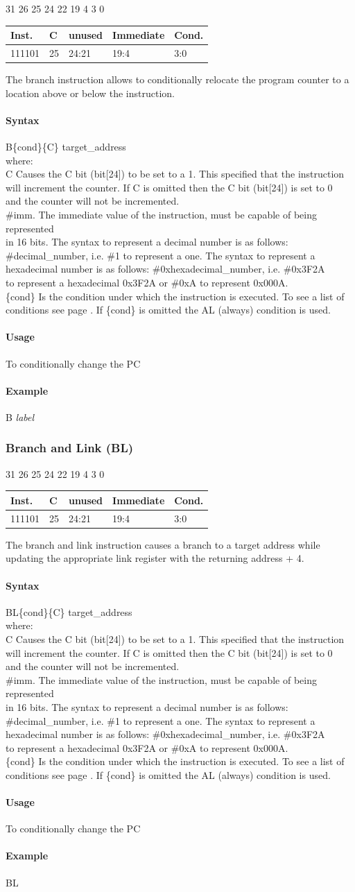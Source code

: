 \documentclass[12pt]{article}
\newcommand{\bTypeInstruction}[5]
{%
    \hspace{1.6cm}31 \hspace{1.15cm}26 \hspace{.08cm}25 \hspace{.08cm}24 \hspace{.45cm}22 \hspace{.05cm}19 \hspace{6.0cm}4 \hspace{.04cm}3 \hspace{1.25cm}0
    \vspace{-.25cm}
    \begin{center}
        \begin{tabular}{|p{1.8cm}|p{.3cm}|p{1.1cm}|p{6.5cm}|p{1.5cm}| }
            \hline
            \textbf{Inst.} & \textbf{C} & unused &\textbf{Immediate}&\textbf{Cond.}\\
            \hline
            #1& 25  & 24:21 &19:4 &3:0\\
            \hline
        \end{tabular}
    \end{center}
    
    \noindent
    #2
    
    \paragraph{Syntax}
    \begin{flushleft}
    #3\{cond\}\{C\} target\_address\\
    \vspace{1em}        %
    where:\\
    \vspace{1em}
    C       \hspace{4.5em} Causes the C bit (bit[24]) to be set to a 1. This specified that the instruction\\
            \hspace{5.4em} will increment the counter. If C is omitted then the C bit (bit[24]) is set to 0\\
            \hspace{5.4em} and the counter will not be incremented.\\
    \vspace{1em}
    \#imm.  \hspace{1.8em} The immediate value of the instruction, must be capable of being represented\\              \hspace{5.4em} in 16 bits. The syntax to represent a decimal number is as follows:\\
            \hspace{5.4em} \#decimal\_number, i.e. \#1 to represent a one. The syntax to represent a\\
            \hspace{5.4em} hexadecimal number is as follows: \#0xhexadecimal\_number, i.e. \#0x3F2A \\
            \hspace{5.4em} to represent a hexadecimal 0x3F2A or \#0xA to represent 0x000A.\\
    \vspace{1em}
    \{cond\}    \hspace{2em} Is the condition under which the instruction is executed. To see a list of\\
                \hspace{5.4em} conditions see page . If \{cond\} is omitted the AL (always) condition is used.\\
    \end{flushleft}
    
    \paragraph{Usage}
    \begin{flushleft}
    #4\\
    \end{flushleft}
    \paragraph{Example}
    \begin{flushleft}
    #5
    \end{flushleft}}
\begin{document}
        \bTypeInstruction
        {111101}
        {The branch instruction allows to conditionally relocate the program counter to a location above or below the instruction.}
        {B}
        {To conditionally change the PC}
        {B \textit{label}}
        
        
    
    \newpage
    \subsubsection{Branch and Link (BL)}
        
        \bTypeInstruction
        {111101}
        {The branch and link instruction causes a branch to a target address while updating the appropriate link register with the returning address + 4.}
        {BL}
        {To conditionally change the PC}
        {BL}
        
        
        
\end{document}
